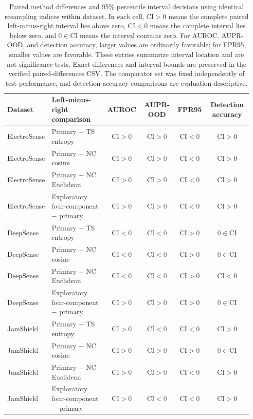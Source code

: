 \begin{table}[!t]
  \caption{Paired method differences and 95\% percentile interval decisions using identical resampling indices within dataset. In each cell, \(\mathrm{CI}>0\) means the complete paired left-minus-right interval lies above zero, \(\mathrm{CI}<0\) means the complete interval lies below zero, and \(0\in\mathrm{CI}\) means the interval contains zero. For AUROC, AUPR-OOD, and detection accuracy, larger values are ordinarily favorable; for FPR95, smaller values are favorable. These entries summarize interval location and are not significance tests. Exact differences and interval bounds are preserved in the verified paired-differences CSV. The comparator set was fixed independently of test performance, and detection-accuracy comparisons are evaluation-descriptive.}
  \label{tab:paired-comparisons}
  \centering
  \scriptsize
  \setlength{\tabcolsep}{2.8pt}
  \renewcommand{\arraystretch}{1.08}
  \newcommand{\CIPositive}{\(\mathrm{CI}>0\)}
  \newcommand{\CINegative}{\(\mathrm{CI}<0\)}
  \newcommand{\CIIncludesZero}{\(0\in\mathrm{CI}\)}
  \begin{tabularx}{\textwidth}{@{}l Y c c c c@{}}
    \toprule
    Dataset & Left-minus-right comparison & AUROC & AUPR-OOD & FPR95 & Detection accuracy \\
    \midrule
    ElectroSense & Primary \(-\) TS entropy & \CIPositive & \CIPositive & \CINegative & \CIPositive \\
    ElectroSense & Primary \(-\) NC cosine & \CIPositive & \CIPositive & \CINegative & \CIPositive \\
    ElectroSense & Primary \(-\) NC Euclidean & \CIPositive & \CIPositive & \CINegative & \CIPositive \\
    ElectroSense & Exploratory four-component \(-\) primary & \CIPositive & \CIPositive & \CINegative & \CIPositive \\
    \addlinespace
    DeepSense & Primary \(-\) TS entropy & \CINegative & \CINegative & \CIPositive & \CIIncludesZero \\
    DeepSense & Primary \(-\) NC cosine & \CINegative & \CINegative & \CIPositive & \CIIncludesZero \\
    DeepSense & Primary \(-\) NC Euclidean & \CINegative & \CINegative & \CIPositive & \CINegative \\
    DeepSense & Exploratory four-component \(-\) primary & \CIPositive & \CIPositive & \CIPositive & \CIIncludesZero \\
    \addlinespace
    JamShield & Primary \(-\) TS entropy & \CIPositive & \CINegative & \CINegative & \CIPositive \\
    JamShield & Primary \(-\) NC cosine & \CIPositive & \CIPositive & \CIPositive & \CIIncludesZero \\
    JamShield & Primary \(-\) NC Euclidean & \CIPositive & \CIPositive & \CINegative & \CIPositive \\
    JamShield & Exploratory four-component \(-\) primary & \CIPositive & \CINegative & \CINegative & \CIPositive \\
    \bottomrule
  \end{tabularx}
\end{table}
